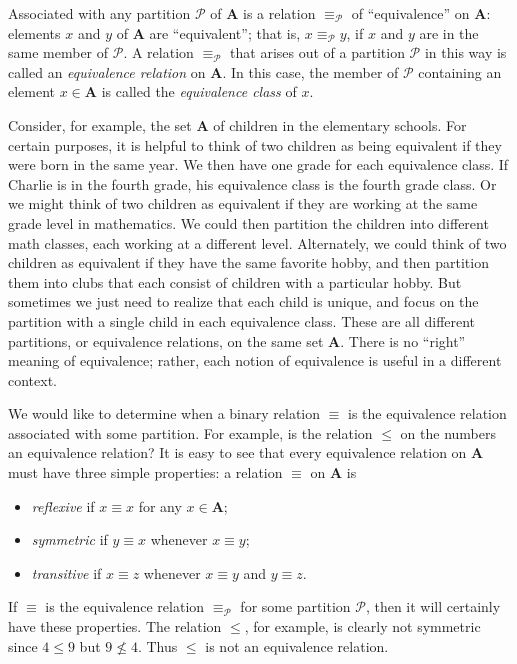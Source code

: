 \documentclass{article}
\newcommand\Pc{\mathcal P}
\newcommand\A{\mathbf A}
\newcommand{\0}{\mathbf 0}
\newcommand{\1}{\mathbf 1}
\begin{document}
Associated with any partition $\Pc$ of $\A$ is a relation $\equiv_{\Pc}$ of ``equivalence'' on $\A$: elements $x$ and $y$ of $\A$ are ``equivalent''; that is, $x \equiv_{\Pc} y$, if $x$ and $y$ are in the same member of $\Pc$. A relation $\equiv_{\Pc}$ that arises out of a partition $\Pc$ in this way is called an \emph{equivalence relation} on $\A$. In this case, the member of $\Pc$ containing an element $x \in \A$ is called the \emph{equivalence class} of $x$.

Consider, for example, the set $\A$ of children in the elementary schools. For certain purposes, it is helpful to think of two children as being equivalent if they were born in the same year. We then have one grade for each equivalence class. If Charlie is in the fourth grade, his equivalence class is the fourth grade class. Or we might think of two children as equivalent if they are working at the same grade level in mathematics. We could then partition the children into different math classes, each working at a different level. Alternately, we could think of two children as equivalent if they have the same favorite hobby, and then partition them into clubs that each consist of children with a particular hobby. But sometimes we just need to realize that each child is unique, and focus on the partition with a single child in each equivalence class. These are all different partitions, or equivalence relations, on the same set $\A$. There is no ``right'' meaning of equivalence; rather, each notion of equivalence is useful in a different context.

We would like to determine when a binary relation $\equiv$ is the equivalence relation associated with some partition. For example, is the relation $\leq$ on the numbers an equivalence relation? It is easy to see that every equivalence relation on $\A$ must have three simple properties: a relation $\equiv$ on $\A$ is
\begin{itemize}
 \item \emph{reflexive} if $x \equiv x$ for any $x \in \A$;
 \item \emph{symmetric} if $y \equiv x$ whenever $x \equiv y$;
 \item \emph{transitive} if $x \equiv z$ whenever $x \equiv y$ and $y \equiv z$.
\end{itemize}

If $\equiv$ is the equivalence relation $\equiv_{\Pc}$ for some partition $\Pc$, then it will certainly have these properties. The relation $\leq$, for example, is clearly not symmetric since $4 \leq 9$ but $9 \nleq 4$. Thus $\leq$ is not an equivalence relation.
\end{document}
